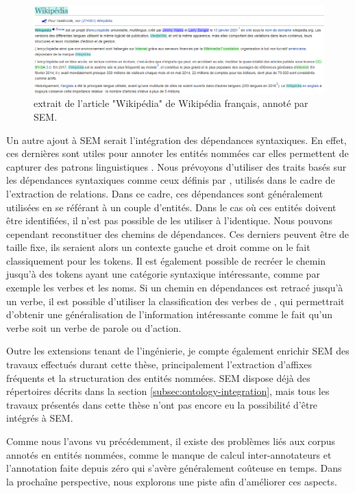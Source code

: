\documentclass[12pt,a4paper,times,twoside,openright]{report}
\begin{document}
\begin{figure}[ht!]
\centering
\includegraphics[scale=0.5]{images/SEM/futur-sem-Wikipedia}
\caption{extrait de l'article "Wikipédia" de Wikipédia français, annoté par SEM.}
\label{fig:sem-wikipedia}
\end{figure}

Un autre ajout à SEM serait l'intégration des dépendances syntaxiques. En effet, ces dernières sont utiles pour annoter les entités nommées car elles permettent de capturer des patrons linguistiques \citep{nguyen2016j,jie2017efficient}. Nous prévoyons d'utiliser des traits basés sur les dépendances syntaxiques comme ceux définis par \citet{mintz2009distant}, utilisés dans le cadre de l'extraction de relations. Dans ce cadre, ces dépendances sont généralement utilisées en se référant à un couple d'entités. Dans le cas où ces entités doivent être identifiées, il n'est pas possible de les utiliser à l'identique. Nous pouvons cependant reconstituer des chemins de dépendances. Ces derniers peuvent être de taille fixe, ils seraient alors un contexte gauche et droit comme on le fait classiquement pour les tokens. Il est également possible de recréer le chemin jusqu'à des tokens ayant une catégorie syntaxique intéressante, comme par exemple les verbes et les noms. Si un chemin en dépendances est retracé jusqu'à un verbe, il est possible d'utiliser la classification des verbes de \citet{dubois1997synonymie}, qui permettrait d'obtenir une généralisation de l'information intéressante comme le fait qu'un verbe soit un verbe de parole ou d'action.

Outre les extensions tenant de l'ingénierie, je compte également enrichir SEM des travaux effectués durant cette thèse, principalement l'extraction d'affixes fréquents et la structuration des entités nommées. SEM dispose déjà des répertoires décrits dans la section \ref{subsec:ontology-integration}, mais tous les travaux présentés dans cette thèse n'ont pas encore eu la possibilité d'être intégrés à SEM.

Comme nous l'avons vu précédemment, il existe des problèmes liés aux corpus annotés en entités nommées, comme le manque de calcul inter-annotateurs et l'annotation faite depuis zéro qui s'avère généralement coûteuse en temps. Dans la prochaîne perspective, nous explorons une piste afin d'améliorer ces aspects.
\end{document}
